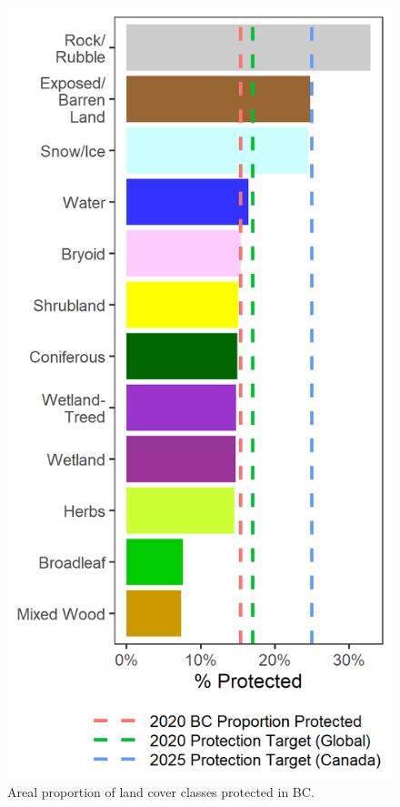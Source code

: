 \documentclass[10pt,oneside]{article}
\makeatletter
\def\maxwidth{\ifdim\Gin@nat@width>\linewidth\linewidth
\else\Gin@nat@width\fi}
\let\Oldincludegraphics\includegraphics
\renewcommand{\includegraphics}[1]{\Oldincludegraphics[width=\maxwidth]{#1}}
\makeatother
\begin{document}
\begin{figure}
\hypertarget{fig:vlce-conch}{%
\centering
\includegraphics{figures/vlce_bar.png}
\caption{Areal proportion of land cover classes protected in
BC.}\label{fig:vlce-conch}
}
\end{figure}
\end{document}
